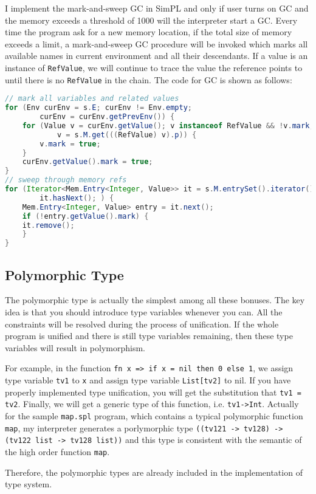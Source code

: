 \documentclass{article}
\begin{document}
I implement the mark-and-sweep GC in SimPL and only if user turns on GC and the memory exceeds a threshold of 1000 will the interpreter start a GC. Every time the program ask for a new memory location, if the total size of memory exceeds a limit, a mark-and-sweep GC procedure will be invoked which marks all available names in current environment and all their descendants. If a value is an instance of \verb|RefValue|, we will continue to trace the value the reference points to until there is no \verb|RefValue| in the chain. The code for GC is shown as follows:
\begin{lstlisting}[language=Java, caption=Garbage Collection Implementation]
// mark all variables and related values
for (Env curEnv = s.E; curEnv != Env.empty; 
		curEnv = curEnv.getPrevEnv()) {
	for (Value v = curEnv.getValue(); v instanceof RefValue && !v.mark; 
			v = s.M.get(((RefValue) v).p)) {
		v.mark = true;
	}
	curEnv.getValue().mark = true;
}
// sweep through memory refs
for (Iterator<Mem.Entry<Integer, Value>> it = s.M.entrySet().iterator();
		it.hasNext(); ) {
	Mem.Entry<Integer, Value> entry = it.next();
	if (!entry.getValue().mark) {
	it.remove();
	}
}
\end{lstlisting}



\subsection{Polymorphic Type}
The polymorphic type is actually the simplest among all these bonuses. The key idea is that you should introduce type variables whenever you can. All the constraints will be resolved during the process of unification. If the whole program is unified and there is still type variables remaining, then these type variables will result in polymorphism.

For example, in the function \verb|fn x => if x = nil then 0 else 1|, we assign type variable \verb|tv1| to \verb|x| and assign type variable \verb|List[tv2]| to nil. If you have properly implemented type unification, you will get the substitution that \verb|tv1 = tv2|. Finally, we will get a generic type of this function, i.e. \verb|tv1->Int|. Actually for the sample \verb|map.spl| program, which contains a typical polymorphic function \verb|map|, my interpreter generates a porlymorphic type \verb|((tv121 -> tv128) -> (tv122 list -> tv128 list))| and this type is consistent with the semantic of the high order function \verb|map|.

Therefore, the polymorphic types are already included in the implementation of type system.
\end{document}
